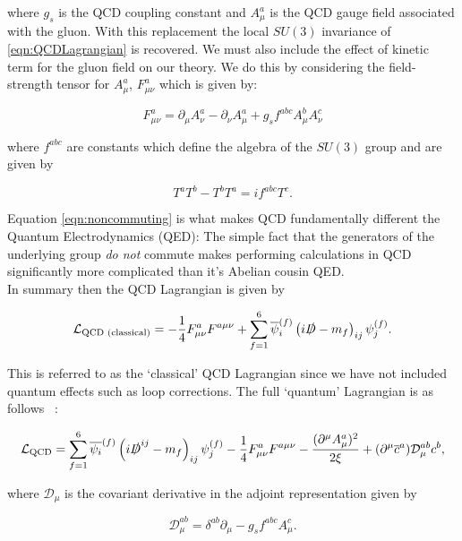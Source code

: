 	\noindent where $g_s$ is the QCD coupling constant and $A_\mu^a$ is the QCD gauge field associated with the gluon.
	With this replacement the local $SU(3)$ invariance of \eqref{eqn:QCDLagrangian} is recovered.  We must also include
	the effect of kinetic term for the gluon field on our theory.  We do this by considering the field-strength tensor for $A^a_\mu$,
	$F^a_{\mu\nu}$ which is given by:

	\begin{equation}
		F^a_{\mu\nu} = \partial_\mu A^a_\nu - \partial_\nu A^a_\mu + g_sf^{abc}A_\mu^bA_\nu^c
	\end{equation}

	\noindent where $f^{abc}$ are constants which define the algebra of the $SU(3)$ group and are given by

	\begin{equation}
		T^aT^b -T^bT^a = if^{abc}T^c.
		\label{eqn:noncommuting}
	\end{equation}

	Equation \eqref{eqn:noncommuting} is what makes QCD fundamentally different the Quantum Electrodynamics (QED):  The simple
	fact that the generators of the underlying group \emph{do not} commute makes performing calculations in QCD
	significantly more complicated than it's Abelian cousin QED.\\
	In summary then the QCD Lagrangian is given by

	\begin{equation}
		\mathcal{L}_{\text{QCD (classical)}} = -\frac{1}{4}F_{\mu\nu}^aF^{a\mu\nu} + \sum_{f=1}^{6}\overline{\psi}_i^{(f)}\left(i\slashed D- m_f\right)_{ij}\psi_j^{(f)}.
	\end{equation}

	This is referred to as the `classical' QCD Lagrangian since we have not included quantum effects such as
	loop corrections.  The full `quantum' Lagrangian is as follows ~\cite{muta}:

	\begin{equation}
		\mathcal{L}_{\text{QCD}}=\sum_{f=1}^{6}\overline{\psi_{i}}^{(f)}\left(i\slashed D^{ij}-m_f\right)_{ij}\psi_{j}^{(f)} -
			\frac{1}{4}F^a_{\mu\nu}F^{a\mu\nu} - \frac{(\partial^\mu A_{\mu}^a)^2}{2\xi} +
			(\partial^\mu \overline{c}^{a})\mathcal{D}_{\mu}^{ab}c^b,
			\label{eqn:fullQCD}
	\end{equation}

	where $\mathcal{D}_{\mu}$ is the covariant derivative in the adjoint representation given by

	\begin{equation}
		\mathcal{D}_\mu^{ab} = \delta^{ab}\partial_\mu - g_sf^{abc}A^c_\mu.
	\end{equation}

